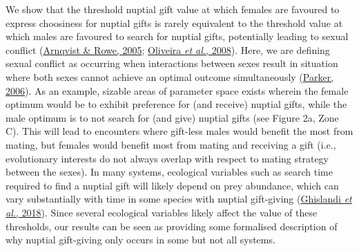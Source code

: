 \documentclass[
]{article}
\begin{document}
We show that the threshold nuptial gift value at which females are
favoured to express choosiness for nuptial gifts is rarely equivalent to
the threshold value at which males are favoured to search for nuptial
gifts, potentially leading to sexual conflict
(\protect\hyperlink{ref-Arnqvist2005a}{Arnqvist \& Rowe, 2005};
\protect\hyperlink{ref-Oliveira2008}{Oliveira \emph{et al.}, 2008}).
Here, we are defining sexual conflict as occurring when interactions
between sexes result in situation where both sexes cannot achieve an
optimal outcome simultaneously
(\protect\hyperlink{ref-Parker2006}{Parker, 2006}). As an example,
sizable areas of parameter space exists wherein the female optimum would
be to exhibit preference for (and receive) nuptial gifts, while the male
optimum is to not search for (and give) nuptial gifts (see Figure 2a,
Zone C). This will lead to encounters where gift-less males would
benefit the most from mating, but females would benefit most from mating
and receiving a gift (i.e., evolutionary interests do not always overlap
with respect to mating strategy between the sexes). In many systems,
ecological variables such as search time required to find a nuptial gift
will likely depend on prey abundance, which can vary substantially with
time in some species with nuptial gift-giving
(\protect\hyperlink{ref-Ghislandi2018}{Ghislandi \emph{et al.}, 2018}).
Since several ecological variables likely affect the value of these
thresholds, our results can be seen as providing some formalised
description of why nuptial gift-giving only occurs in some but not all
systems.
\end{document}
